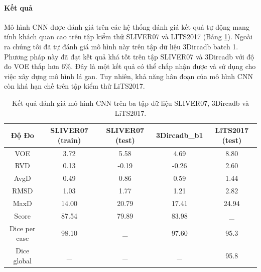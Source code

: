 \paragraph{Kết quả}
Mô hình CNN được đánh giá trên các hệ thống đánh giá kết quả tự động mang tính khách quan cao trên tập kiểm thử SLIVER07 và LITS2017 (Bảng \ref{tab:CNN-SLIVER07_Test}). Ngoài ra chúng tôi đã tự đánh giá mô hình này trên tập dữ liệu 3Dircadb batch 1. Phương pháp này đã đạt kết quả khá tốt trên tập SLIVER07 và 3Dircadb với độ đo VOE thấp hơn 6\%. Đây là một kết quả có thể chấp nhận được và sử dụng cho việc xây dựng mô hình lá gan. Tuy nhiên, khả năng hân đoạn của mô hình CNN còn khá hạn chế trên tập kiểm thử LiTS2017.
\begin{table}[]
\begin{tabular}{|c|c|c|c|c|}
\hline
\textbf{Độ Đo} & \textbf{SLIVER07 (train)} & \textbf{SLIVER07 (test)} & \textbf{3Dircadb\_b1} & \textbf{LiTS2017 (test)} \\ \hline
VOE            & 3.72                      & 5.58                     & 4.69                  & 8.80                     \\ \hline
RVD            & 0.13                      & -0.19                    & -0.26                 & 2.60                     \\ \hline
AvgD           & 0.49                      & 0.86                     & 0.59                  & 1.44                     \\ \hline
RMSD           & 1.03                      & 1.77                     & 1.21                  & 2.82                     \\ \hline
MaxD           & 14.00                     & 20.79                    & 17.41                 & 24.94                    \\ \hline
Score          & 87.54                     & 79.89                    & 83.98                 & \_                       \\ \hline
Dice per case  & 98.10                     & \_                       & 97.60                 & 95.3                     \\ \hline
Dice global    & \_                        & \_                       & \_                    & 95.8                     \\ \hline
\end{tabular}
\caption{\label{tab:CNN-SLIVER07_Test}Kết quả đánh giá mô hình CNN trên ba tập dữ liệu SLIVER07, 3Dircadb và LiTS2017.}
\end{table}


